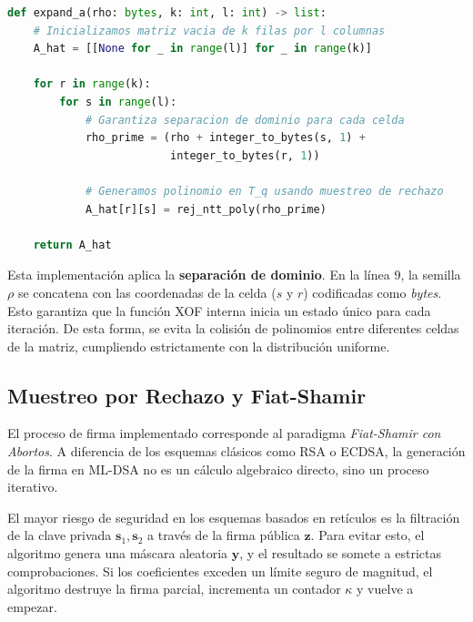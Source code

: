 \documentclass[11pt, a4paper]{report}
\theoremstyle{definition}
\begin{document}
\begin{minipage}{\linewidth}
\begin{lstlisting}[language=Python, caption={Implementación de \texttt{ExpandA} asegurando la separación de dominio.}, label={lst:expand_a_python}]
def expand_a(rho: bytes, k: int, l: int) -> list:
    # Inicializamos matriz vacia de k filas por l columnas
    A_hat = [[None for _ in range(l)] for _ in range(k)]
    
    for r in range(k):
        for s in range(l):
            # Garantiza separacion de dominio para cada celda
            rho_prime = (rho + integer_to_bytes(s, 1) + 
                         integer_to_bytes(r, 1))
            
            # Generamos polinomio en T_q usando muestreo de rechazo
            A_hat[r][s] = rej_ntt_poly(rho_prime)
            
    return A_hat
\end{lstlisting}
\end{minipage}

Esta implementación aplica la \textbf{separación de dominio}. En la línea 9, la semilla $\rho$ se concatena con las coordenadas de la celda ($s$ y $r$) codificadas como \textit{bytes}. Esto garantiza que la función XOF interna inicia un estado único para cada iteración. De esta forma, se evita la colisión de polinomios entre diferentes celdas de la matriz, cumpliendo estrictamente con la distribución uniforme.


\subsection{Muestreo por Rechazo y Fiat-Shamir}
\label{subsec:sign_reject}

El proceso de firma implementado corresponde al paradigma \textit{Fiat-Shamir con Abortos}\cite{lyubashevsky2009fiat}. A diferencia de los esquemas clásicos como RSA o ECDSA, la generación de la firma en ML-DSA no es un cálculo algebraico directo, sino un proceso iterativo. 

El mayor riesgo de seguridad en los esquemas basados en retículos es la filtración de la clave privada $\mathbf{s}_1, \mathbf{s}_2$ a través de la firma pública $\mathbf{z}$. Para evitar esto, el algoritmo genera una máscara aleatoria $\mathbf{y}$, y el resultado se somete a estrictas comprobaciones. Si los coeficientes exceden un límite seguro de magnitud, el algoritmo destruye la firma parcial, incrementa un contador $\kappa$ y vuelve a empezar.
\end{document}
